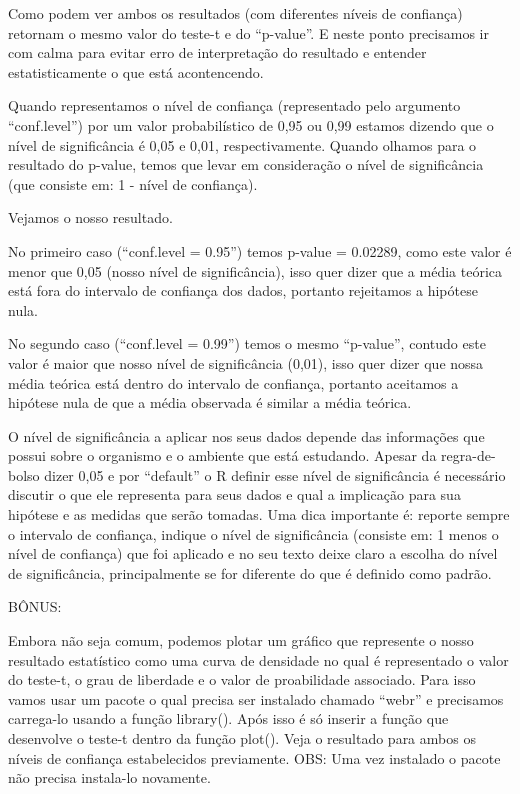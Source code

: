 \documentclass[]{book}
\begin{document}
Como podem ver ambos os resultados (com diferentes níveis de confiança) retornam o mesmo valor do teste-t e do ``p-value''. E neste ponto precisamos ir com calma para evitar erro de interpretação do resultado e entender estatisticamente o que está acontencendo.

Quando representamos o nível de confiança (representado pelo argumento ``conf.level'') por um valor probabilístico de 0,95 ou 0,99 estamos dizendo que o nível de significância é 0,05 e 0,01, respectivamente. Quando olhamos para o resultado do p-value, temos que levar em consideração o nível de significância (que consiste em: 1 - nível de confiança).

Vejamos o nosso resultado.

No primeiro caso (``conf.level = 0.95'') temos p-value = 0.02289, como este valor é menor que 0,05 (nosso nível de significância), isso quer dizer que a média teórica está fora do intervalo de confiança dos dados, portanto rejeitamos a hipótese nula.

No segundo caso (``conf.level = 0.99'') temos o mesmo ``p-value'', contudo este valor é maior que nosso nível de significância (0,01), isso quer dizer que nossa média teórica está dentro do intervalo de confiança, portanto aceitamos a hipótese nula de que a média observada é similar a média teórica.

O nível de significância a aplicar nos seus dados depende das informações que possui sobre o organismo e o ambiente que está estudando. Apesar da regra-de-bolso dizer 0,05 e por ``default'' o R definir esse nível de significância é necessário discutir o que ele representa para seus dados e qual a implicação para sua hipótese e as medidas que serão tomadas. Uma dica importante é: reporte sempre o intervalo de confiança, indique o nível de significância (consiste em: 1 menos o nível de confiança) que foi aplicado e no seu texto deixe claro a escolha do nível de significância, principalmente se for diferente do que é definido como padrão.

BÔNUS:

Embora não seja comum, podemos plotar um gráfico que represente o nosso resultado estatístico como uma curva de densidade no qual é representado o valor do teste-t, o grau de liberdade e o valor de proabilidade associado. Para isso vamos usar um pacote o qual precisa ser instalado chamado ``webr'' e precisamos carrega-lo usando a função library(). Após isso é só inserir a função que desenvolve o teste-t dentro da função plot(). Veja o resultado para ambos os níveis de confiança estabelecidos previamente. OBS: Uma vez instalado o pacote não precisa instala-lo novamente.
\end{document}

